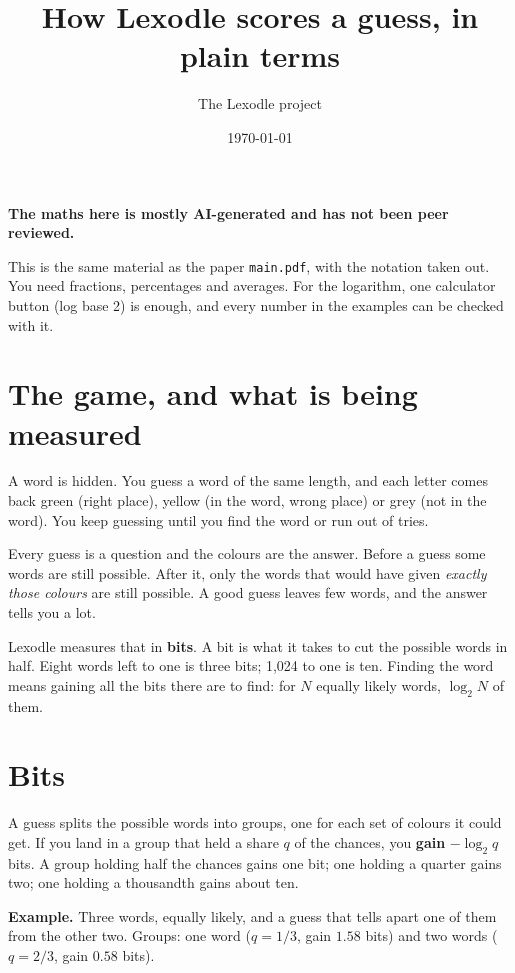 \documentclass[11pt]{article}
\title{How Lexodle scores a guess, in plain terms}
\author{The Lexodle project}
\date{\today}
\begin{document}
\maketitle

\textbf{The maths here is mostly AI-generated and has not been peer reviewed.}

This is the same material as the paper \texttt{main.pdf}, with the notation taken out. You need
fractions, percentages and averages. For the logarithm, one calculator button (log base 2) is
enough, and every number in the examples can be checked with it.

\tableofcontents

\section{The game, and what is being measured}

A word is hidden. You guess a word of the same length, and each letter comes back green (right
place), yellow (in the word, wrong place) or grey (not in the word). You keep guessing until you
find the word or run out of tries.

Every guess is a question and the colours are the answer. Before a guess some words are still
possible. After it, only the words that would have given \emph{exactly those colours} are still
possible. A good guess leaves few words, and the answer tells you a lot.

Lexodle measures that in \textbf{bits}. A bit is what it takes to cut the possible words in half.
Eight words left to one is three bits; 1,024 to one is ten. Finding the word means gaining all the
bits there are to find: for $N$ equally likely words, $\log_2 N$ of them.

\section{Bits}\label{sec:bits}

A guess splits the possible words into groups, one for each set of colours it could get. If you
land in a group that held a share $q$ of the chances, you \textbf{gain} $-\log_2 q$ bits. A group
holding half the chances gains one bit; one holding a quarter gains two; one holding a thousandth
gains about ten.

\textbf{Example.} Three words, equally likely, and a guess that tells apart one of them from the
other two. Groups: one word ($q=1/3$, gain $1.58$ bits) and two words ($q=2/3$, gain $0.58$ bits).
\end{document}
